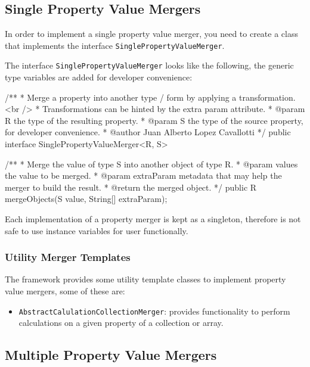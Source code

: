 \documentclass[11pt]{article}
\begin{document}
\subsection{Single Property Value Mergers}

In order to implement a single property value merger, you need to create a class that implements the interface \texttt{SinglePropertyValueMerger}.

The interface \texttt{SinglePropertyValueMerger} looks like the following, the generic type variables are added for developer convenience:

\begin{java}

/**
 * Merge a property into another type / form by applying a transformation. <br />
 * Transformations can be hinted by the extra param attribute.
 * @param R the type of the resulting property.
 * @param S the type of the source property, for developer convenience.
 * @author Juan Alberto Lopez Cavallotti
 */
public interface SinglePropertyValueMerger<R, S> {

    /**
     * Merge the value of type S into another object of type R.
     * @param values the value to be merged.
     * @param extraParam metadata that may help the merger to build the result.
     * @return the merged object.
     */
    public R mergeObjects(S value, String[] extraParam);
}

\end{java}

Each implementation of a property merger is kept as a singleton, therefore is not safe to use instance variables for user functionally.

\subsubsection{Utility Merger Templates}

The framework provides some utility template classes to implement property value mergers, some of these are:

\begin{itemize}
\item \texttt{AbstractCalulationCollectionMerger}: provides functionality to perform calculations on a given property of a collection or array.
\end{itemize}


\subsection{Multiple Property Value Mergers}
\end{document}
